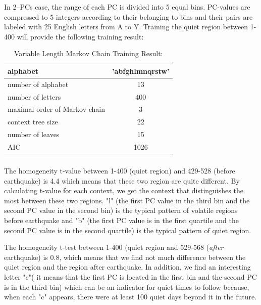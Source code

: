 \documentclass{beamer}
\begin{document}
\begin{frame}
\frametitle{}
In 2--PCs case, the range of each PC is  divided into 5 equal bins. PC-values are
compressed to 5 integers according to their belonging to
bins and their pairs are labeled with 25
English letters from A to Y.
Training the quiet region between 1-400 will provide the following training result:
\begin{table}[h!]
\caption {Variable Length Markov Chain Training Result: }
\centering
\begin{tabular}{ l | c }
    \hline

    alphabet  & 'abfghlmnqrstw' \\ \hline
    number of alphabet &  13 \\ \hline
    number of letters &  400 \\ \hline
    maximal order of Markov chain & 3 \\ \hline
    context tree size & 22 \\ \hline
    number of leaves & 15\\ \hline
    AIC & 1026 \\ \hline
  \end{tabular}
\end{table}







\end{frame}
\begin{frame}
\frametitle{}
\par The homogeneity t-value between 1-400 (quiet region) and 429-528 (before earthquake) is 4.4 which means that these
two region are quite different. By calculating t-value for each context, we get the context that  distinguishes the most between
these two regions. "l" (the first PC value in the third bin and the second PC value in the second bin)
is the typical pattern of volatile regions before earthquake and "b" (the first PC value is in the first quartile
and the second PC value is in the second quartile) is the typical pattern of quiet region.

\par The homogeneity t-test between 1-400 (quiet region and 529-568 ({\it after} earthquake) is 0.8, which means that we
find not much difference between the quiet region and the region after earthquake. In addition, we find an interesting
letter "c"( it means that the first PC is located in the first bin and the second PC is in the third bin)
which can be an indicator for quiet times to follow because, when  each "c"  appears, there were at least 100 quiet days beyond it in the future.

\end{frame}
\end{document}
